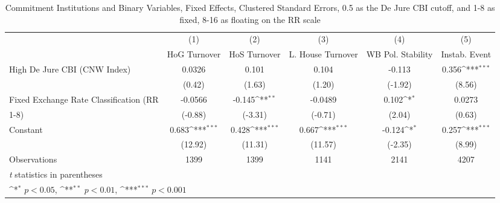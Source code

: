\begin{table}[htbp]\centering
\def\sym#1{\ifmmode^{#1}\else\(^{#1}\)\fi}
\caption{Commitment Institutions and Binary Variables, Fixed Effects, Clustered Standard Errors, 0.5 as the De Jure CBI cutoff, and 1-8 as fixed, 8-16 as floating on the RR scale \label{binaryIndFEDJ}}
\begin{tabular}{l*{5}{c}}
\toprule
                                        &\multicolumn{1}{c}{(1)}&\multicolumn{1}{c}{(2)}&\multicolumn{1}{c}{(3)}&\multicolumn{1}{c}{(4)}&\multicolumn{1}{c}{(5)}\\
                                        &\multicolumn{1}{c}{HoG Turnover}&\multicolumn{1}{c}{HoS Turnover}&\multicolumn{1}{c}{L. House Turnover}&\multicolumn{1}{c}{WB Pol. Stability}&\multicolumn{1}{c}{Instab. Event}\\
\midrule
High De Jure CBI (CNW Index)            &   0.0326         &    0.101         &    0.104         &   -0.113         &    0.356\sym{***}\\
                                        &   (0.42)         &   (1.63)         &   (1.20)         &  (-1.92)         &   (8.56)         \\
\addlinespace
Fixed Exchange Rate Classification (RR  &  -0.0566         &   -0.145\sym{**} &  -0.0489         &    0.102\sym{*}  &   0.0273         \\
1-8)                                    &  (-0.88)         &  (-3.31)         &  (-0.71)         &   (2.04)         &   (0.63)         \\
\addlinespace
Constant                                &    0.683\sym{***}&    0.428\sym{***}&    0.667\sym{***}&   -0.124\sym{*}  &    0.257\sym{***}\\
                                        &  (12.92)         &  (11.31)         &  (11.57)         &  (-2.35)         &   (8.99)         \\
\midrule
Observations                            &     1399         &     1399         &     1141         &     2141         &     4207         \\
\bottomrule
\multicolumn{6}{l}{\footnotesize \textit{t} statistics in parentheses}\\
\multicolumn{6}{l}{\footnotesize \sym{*} \(p<0.05\), \sym{**} \(p<0.01\), \sym{***} \(p<0.001\)}\\
\end{tabular}
\end{table}

